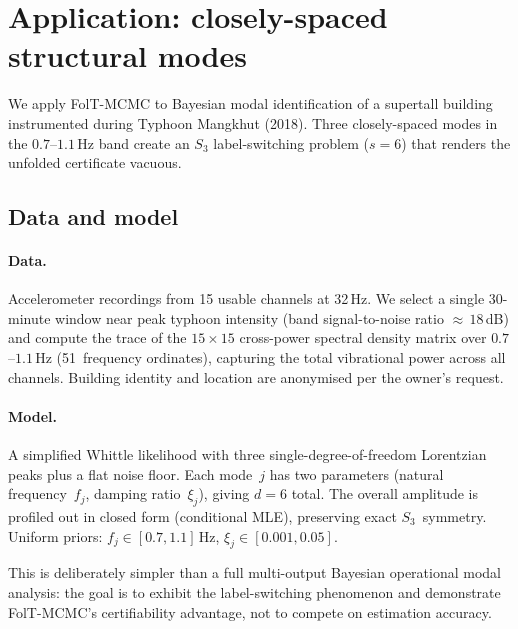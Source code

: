 %  

\section{Application: closely-spaced structural modes}
\label{sec:application}

We apply FolT-MCMC to Bayesian modal identification of a
supertall building instrumented during Typhoon Mangkhut (2018).
Three closely-spaced modes in the $0.7$--$1.1$\,Hz band create
an $S_3$ label-switching problem ($s = 6$) that renders the
unfolded certificate vacuous.


\subsection{Data and model}
\label{sec:app_setup}

\paragraph{Data.}
Accelerometer recordings from 15 usable channels at 32\,Hz.
We select a single 30-minute window near peak typhoon intensity
(band signal-to-noise ratio ${\approx}\,18$\,dB) and compute
the trace of the $15 \times 15$ cross-power spectral density
matrix over $0.7$--$1.1$\,Hz (51~frequency ordinates),
capturing the total vibrational power across all channels.
Building identity and location are anonymised per the owner's
request.

\paragraph{Model.}
A simplified Whittle likelihood with three single-degree-of-freedom
Lorentzian peaks plus a flat noise floor.  Each mode~$j$ has two
parameters (natural frequency~$f_j$, damping ratio~$\xi_j$),
giving $d = 6$ total.  The overall amplitude is profiled out in
closed form (conditional MLE), preserving exact $S_3$~symmetry.
Uniform priors: $f_j \in [0.7, 1.1]$\,Hz,
$\xi_j \in [0.001, 0.05]$.

This is deliberately simpler than a full multi-output Bayesian
operational modal analysis: the goal is to exhibit the
label-switching phenomenon and demonstrate FolT-MCMC's
certifiability advantage, not to compete on estimation accuracy.

